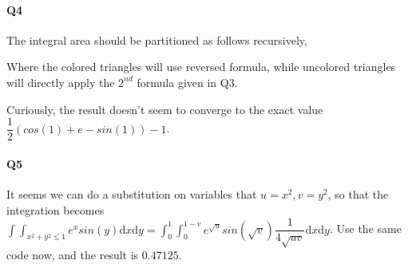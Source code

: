 \documentclass[11pt]{article}
\begin{document}
\paragraph{Q4}
The integral area should be partitioned as follows recursively,
\begin{figure}[H]
	\centering
\end{figure}
Where the colored triangles will use reversed formula, while uncolored triangles will directly apply the $2^{nd}$ formula given in Q3.
\begin{figure}[H]
	\centering
\end{figure}
Curiously, the result doesn't seem to converge to the exact value $\dfrac{1}{2}(cos(1) + e - sin(1)) - 1$.
\paragraph{Q5}
It seems we can do a substitution on variables that $u=x^2,v=y^2$, so that the integration becomes $\int\int_{x^2+y^2\le1}e^xsin(y)\mathrm{d}x\mathrm{d}y=\int_{0}^{1}\int_{0}^{1-v}e^{\sqrt{u}}sin(\sqrt{v})\dfrac{1}{4\sqrt{uv}}\mathrm{d}x\mathrm{d}y$. Use the same code now, and the result is $0.47125$.
\begin{figure}[H]
	\centering
\end{figure}
\end{document}
